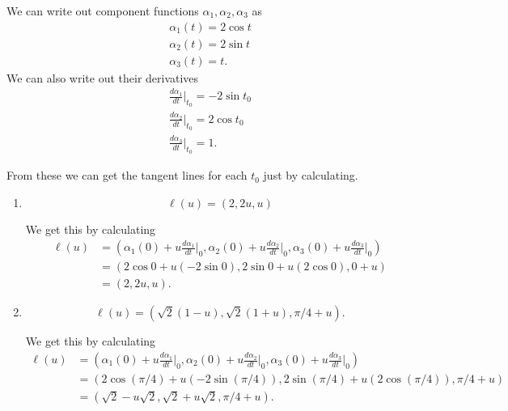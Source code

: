 \documentclass[12 pt, letterpaper]{hmcpset}
\begin{document}
\begin{solution}
	We can write out component functions $\alpha_1, \alpha_2, \alpha_3$ as
	\[
		\begin{gathered}
			\alpha_1(t) = 2 \cos t \\
			\alpha_2(t) = 2 \sin t \\
			\alpha_3(t) = t.
		\end{gathered}
	\]
	We can also write out their derivatives
	\[
		\begin{gathered}
			\frac{d \alpha_1}{dt} \Big |_{t_0} = - 2 \sin t_0 \\
			\frac{d \alpha_2}{dt} \Big |_{t_0} = 2 \cos t_0 \\
			\frac{d \alpha_3}{dt} \Big |_{t_0} = 1.
		\end{gathered}
	\] 

	From these we can get the tangent lines for each $t_0$ just by calculating.
	\begin{enumerate}
		\item
			\[
				\boxed{
					\ell(u) = (2, 2 u, u)
				}
			\] 

			We get this by calculating
			\[
				\begin{split}
					\ell(u) & = \left ( \alpha_1(0) + u \frac{d \alpha_1}{dt} \Big |_0, \alpha_2(0) + u \frac{d \alpha_2}{dt} \Big |_0, \alpha_3(0) + u \frac{d \alpha_3}{dt} \Big |_0 \right ) \\
						& = ( 2 \cos 0 + u (-2 \sin 0), 2 \sin 0 + u (2 \cos 0), 0 + u) \\
						& = (2, 2u, u).
				\end{split}
			\]
		\item
			\[
				\boxed{
					\ell(u) = (\sqrt 2 (1 - u), \sqrt 2 (1 + u), \pi/4 + u).
				}
			\] 

			We get this by calculating
			\[
				\begin{split}
					\ell(u) & = \left ( \alpha_1(0) + u \frac{d \alpha_1}{dt} \Big |_0, \alpha_2(0) + u \frac{d \alpha_2}{dt} \Big |_0, \alpha_3(0) + u \frac{d \alpha_3}{dt} \Big |_0 \right ) \\
						& = ( 2 \cos (\pi/4) + u (-2 \sin (\pi/4)), 2 \sin (\pi/4) + u (2 \cos (\pi/4)), \pi/4 + u) \\
						& = (\sqrt 2 - u \sqrt 2, \sqrt 2 + u \sqrt 2, \pi/4 + u).
				\end{split}
			\]
	\end{enumerate}
\end{solution}

\pagebreak
\end{document}
